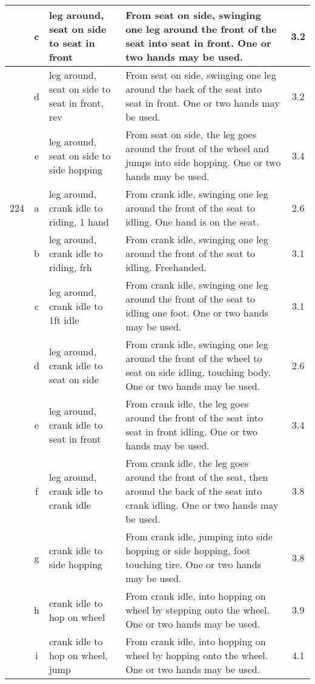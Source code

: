 \begin{longtable}{|r|c|p{4cm}|p{8cm}|c|}
\hline
  & c & leg around, seat on side to seat in front & From seat on side, swinging one leg around the front of the seat into seat in front. One or two hands may be used.  & 3.2 \\ 
\hline
  & d & leg around, seat on side to seat in front, rev  & From seat on side, swinging one leg around the back of the seat into seat in front. One or two hands may be used. & 3.2 \\ 
\hline
  & e & leg around, seat on side to side hopping  & From seat on side, the leg goes around the front of the wheel and jumps into side hopping. One or two hands may be used.  & 3.4 \\ 
\hline
224 & a & leg around, crank idle to riding, 1 hand  & From crank idle, swinging one leg around the front of the seat to idling. One hand is on the seat.  & 2.6 \\ 
\hline
  & b & leg around, crank idle to riding, frh & From crank idle, swinging one leg around the front of the seat to idling. Freehanded. & 3.1 \\ 
\hline
  & c & leg around, crank idle to 1ft idle  & From crank idle, swinging one leg around the front of the seat to idling one foot. One or two hands may be used.  & 3.1 \\ 
\hline
  & d & leg around, crank idle to seat on side  & From crank idle, swinging one leg around the front of the wheel to seat on side idling, touching body. One or two hands may be used.  & 2.6 \\ 
\hline
  & e & leg around, crank idle to seat in front & From crank idle, the leg goes around the front of the seat into seat in front idling. One or two hands may be used. & 3.4 \\ 
\hline
  & f & leg around, crank idle to crank idle  & From crank idle, the leg goes around the front of the seat, then around the back of the seat into crank idling. One or two hands may be used. & 3.8 \\ 
\hline
  & g & crank idle to side hopping  & From crank idle, jumping into side hopping or side hopping, foot touching tire. One or two hands may be used. & 3.8 \\ 
\hline
  & h & crank idle to hop on wheel  & From crank idle, into hopping on wheel by stepping onto the wheel. One or two hands may be used.  & 3.9 \\ 
\hline
  & i & crank idle to hop on wheel, jump  & From crank idle, into hopping on wheel by hopping onto the wheel. One or two hands may be used. & 4.1 \\ 

\end{longtable}
